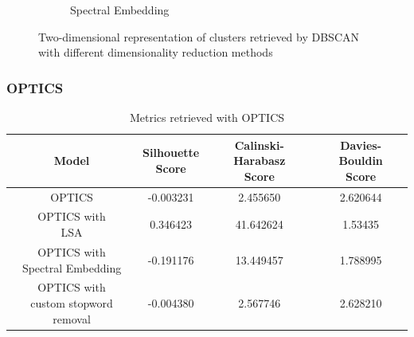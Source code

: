 \begin{figure}
\begin{subfigure}{.3\textwidth}
    \caption{Spectral Embedding}
    \label{fig:dbscan_spectral}
  \end{subfigure}
  \caption{Two-dimensional representation of clusters retrieved by DBSCAN with different dimensionality reduction methods}
  \label{fig:affinity_propagation}
\end{figure}

\subsubsection{OPTICS}

\begin{table}[]
  \centering
  \begin{tabular}{c|c|c|c}
    Model &  \shortstack[c]{Silhouette \\ Score} & \shortstack[c]{Calinski-Harabasz \\ Score} &  \shortstack[c]{Davies-Bouldin \\ Score}  \\
    \hline
    \hline
    OPTICS & -0.003231 & 2.455650 & 2.620644 \\
    \hline
    \shortstack[c]{OPTICS with \\ LSA} & 0.346423 & 41.642624 & 1.53435 \\
    \hline
    \shortstack[c]{OPTICS with \\ Spectral Embedding} & -0.191176 & 13.449457 & 1.788995 \\
    \hline
    \shortstack[c]{OPTICS with \\ custom stopword removal} & -0.004380 & 2.567746 & 2.628210 \\
   \end{tabular}
  \caption{Metrics retrieved with OPTICS}
  \label{tab:scores_optics}
\end{table}

